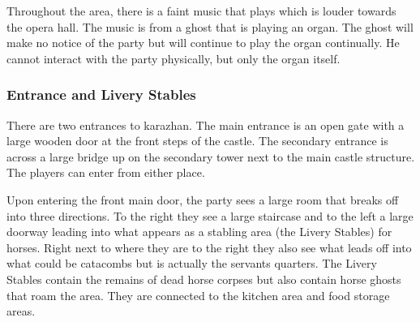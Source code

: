 Throughout the area, there is a faint music that plays which is louder towards the opera hall. The music is from a ghost that is playing an organ. The ghost will make no notice of the party but will continue to play the organ continually. He cannot interact with the party physically, but only the organ itself.

\subsubsection{Entrance and Livery Stables}

There are two entrances to karazhan. The main entrance is an open gate with a large wooden door at the front steps of the castle. The secondary entrance is across a large bridge up on the secondary tower next to the main castle structure. The players can enter from either place. 

Upon entering the front main door, the party sees a large room that breaks off into three directions. To the right they see a large staircase and to the left a large doorway leading into what appears as a stabling area (the Livery Stables) for horses. Right next to where they are to the right they also see what leads off into what could be catacombs but is actually the servants quarters. The Livery Stables contain the remains of dead horse corpses but also contain horse ghosts that roam the area. They are connected to the kitchen area and food storage areas.


